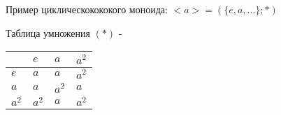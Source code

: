 \documentclass[../main/document.tex]{subfiles}
\begin{document}
\begin{exm}\label{cyclical-exm}
Пример циклическокококого моноида:
$<a>=(\{e,a,...\};*)$

Таблица умножения $(*)$ -
\begin{table}[h]
\centering
\renewcommand*{\arraystretch}{1.4}
\begin{tabular}{|l|l|l|l|}
\hline
  & $e$ & $a$ & $a^2$ \\ \hline
$e$ & $a$ & $a$ & $a^2$ \\ \hline
$a$ & $a$ & $a^2$ & $a$ \\ \hline
$a^2$ & $a^2$ & $a$ & $a^2$ \\
\hline
\end{tabular}
\end{table}
\end{exm}
\end{document}

